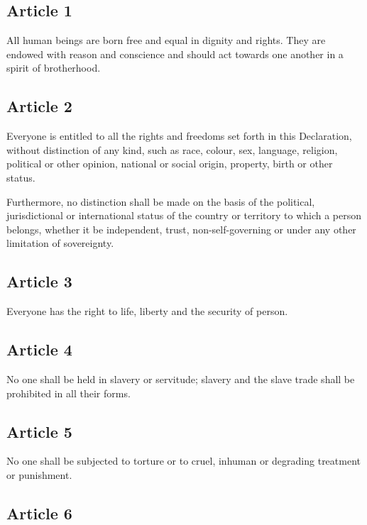 \documentclass[
  ngerman,
  american,
  titlepage,
  openright,
  DIV=calc,
  toc=listof,
  listof=nochaptergap]{scrbook}
\begin{document}
\subsection{Article 1}\label{article-1-4}

All human beings are born free and equal in dignity and rights. They are
endowed with reason and conscience and should act towards one another in
a spirit of brotherhood.

\subsection{Article 2}\label{article-2-4}

Everyone is entitled to all the rights and freedoms set forth in this
Declaration, without distinction of any kind, such as race, colour, sex,
language, religion, political or other opinion, national or social
origin, property, birth or other status.

Furthermore, no distinction shall be made on the basis of the political,
jurisdictional or international status of the country or territory to
which a person belongs, whether it be independent, trust,
non-self-governing or under any other limitation of sovereignty.

\subsection{Article 3}\label{article-3-4}

Everyone has the right to life, liberty and the security of person.

\subsection{Article 4}\label{article-4-4}

No one shall be held in slavery or servitude; slavery and the slave
trade shall be prohibited in all their forms.

\subsection{Article 5}\label{article-5-4}

No one shall be subjected to torture or to cruel, inhuman or degrading
treatment or punishment.

\subsection{Article 6}\label{article-6-4}
\end{document}
